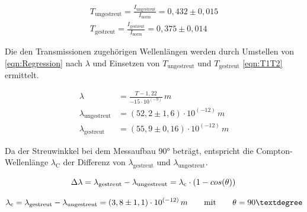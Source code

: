 \documentclass[titlepage = firstcover]{scrartcl}
\begin{document}
        \begin{align}
            T_{\text{ungestreut}} = \frac{I_{\text{ungestreut}}}{I_{\text{norm}}}=0,432 \pm 0,015\\
            T_{\text{gestreut}} = \frac{I_{\text{gestreut}}}{I_{\text{norm}}}=0,375 \pm 0,014
            \label{eqn:T1T2}
        \end{align}

        \noindent
        Die den Transmissionen zugehörigen Wellenlängen werden durch Umstellen von \ref{eqn:Regression} nach $\lambda$ und Einsetzen von $T_{\text{ungestreut}}$
        und $T_{\text{gestreut}}$ \ref{eqn:T1T2} ermittelt.

        \begin{align}
            \lambda &= \frac{T - 1,22}{-15\cdot 10^{\left(-9\right)}} \, m \\
            \lambda_{\text{ungestreut}} &= (52,2 \pm 1,6) \cdot 10^{\left(-12\right)} \, m \\
            \lambda_{\text{gestreut}} &= (55,9 \pm 0,16) \cdot 10^{\left(-12\right)} \, m
            \label{eqn:y1,y2}
        \end{align}

        \noindent
        Da der Streuwinkkel bei dem Messaufbau 90° beträgt, entspricht die Compton-Wellenlänge $\lambda_{\text{C}}$ der Differenz von $\lambda_{\text{gestreut}}$
        und $\lambda_{\text{ungestreut}}$.
        
        \begin{equation}
            \Delta \lambda = \lambda_{\text{gestreut}} - \lambda_{\text{ungestreut}} = \lambda_{\text{c}} \cdot \left(1 -cos (\theta)\right) \\
            \label{eqn:ycexp}
        \end{equation}

        \begin{equation}
            \lambda_{\text{c}} = \lambda_{\text{gestreut}} - \lambda_{\text{ungestreut}} = (3,8 \pm 1,1) \cdot 10^{\left(-12\right)} \, m \qquad \text{mit} \qquad \theta=90° \\
            \label{eqn:ycwert}
        \end{equation} 
\end{document}
